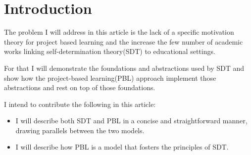 \section{Introduction}
The problem I will address in this article is the lack of a specific motivation
theory for project based learning and the increase the few number of academic
works linking self-determination theory(SDT) to educational settings.

For that I will demonstrate the foundations and abstractions used by
SDT and show how the project-based learning(PBL) approach implement
those abstractions and rest on top of those foundations.

I intend to contribute the following in this article:

\begin{itemize}
 
    \item I will describe both SDT and PBL in a concise and straightforward manner,
    drawing parallels between the two models.

    \item I will describe how PBL is a model that fosters the principles of SDT.

\end{itemize}

